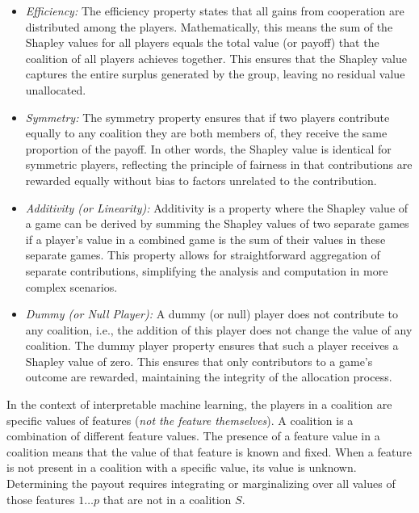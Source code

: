 \begin{itemize}
    \item \emph{Efficiency:}
    The efficiency property states that all gains from cooperation are distributed among the players. Mathematically, this means the sum of the Shapley values for all players equals the total value (or payoff) that the coalition of all players achieves together. This ensures that the Shapley value captures the entire surplus generated by the group, leaving no residual value unallocated.

    \item \emph{Symmetry:}
    The symmetry property ensures that if two players contribute equally to any coalition they are both members of, they receive the same proportion of the payoff. In other words, the Shapley value is identical for symmetric players, reflecting the principle of fairness in that contributions are rewarded equally without bias to factors unrelated to the contribution.

    \item \emph{Additivity (or Linearity):}
    Additivity is a property where the Shapley value of a game can be derived by summing the Shapley values of two separate games if a player's value in a combined game is the sum of their values in these separate games. This property allows for straightforward aggregation of separate contributions, simplifying the analysis and computation in more complex scenarios.

    \item \emph{Dummy (or Null Player):}
    A dummy (or null) player does not contribute to any coalition, i.e., the addition of this player does not change the value of any coalition. The dummy player property ensures that such a player receives a Shapley value of zero. This ensures that only contributors to a game's outcome are rewarded, maintaining the integrity of the allocation process.
\end{itemize}

In the context of interpretable machine learning, the players in a coalition are specific values of features (\emph{not the feature themselves}). A coalition is a combination of different feature values. The presence of a feature value in a coalition means that the value of that feature is known and fixed. When a feature is not present in a coalition with a specific value, its value is unknown. Determining the payout requires integrating or marginalizing over all values of those features $1 \ldots p$ that are not in a coalition $S$.

